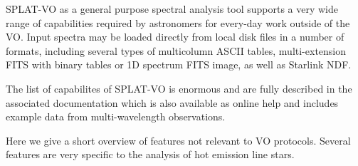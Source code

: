 \documentclass[final,authoryear,5p,times,twocolumn]{elsarticle}
\begin{document}
SPLAT-VO as a general purpose spectral analysis tool supports a very wide
range of capabilities required by astronomers for every-day work outside of
the VO. Input spectra may be loaded directly from local disk files in a number
of formats, including several types of multicolumn ASCII tables,
multi-extension FITS with binary tables or 1D spectrum FITS image, as well as
Starlink NDF.

The list of capabilites of SPLAT-VO is enormous and are fully described in
the associated documentation \citep[SUN/243;][]{sun243} which is also
available as online help and includes example data from
multi-wavelength observations.

Here we give a short overview of features not relevant to VO protocols.
Several features are very specific to the analysis of hot emission
line stars.
\end{document}
